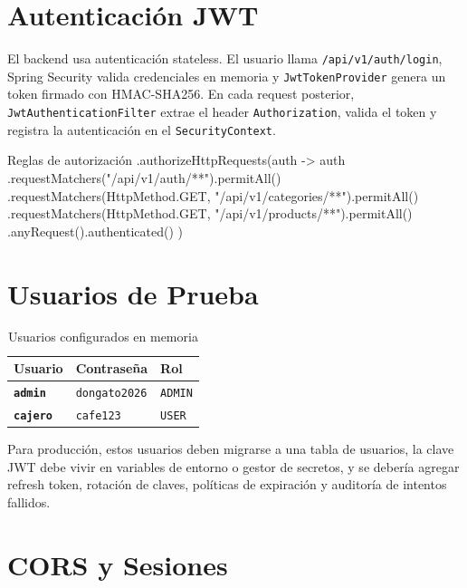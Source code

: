 \documentclass[11pt,oneside]{report}
\begin{document}
\section{Autenticación JWT}

El backend usa autenticación stateless. El usuario llama \texttt{/api/v1/auth/login}, Spring Security valida credenciales en memoria y \texttt{JwtTokenProvider} genera un token firmado con HMAC-SHA256. En cada request posterior, \texttt{JwtAuthenticationFilter} extrae el header \texttt{Authorization}, valida el token y registra la autenticación en el \texttt{SecurityContext}.

\begin{codewindow}[language=Java]{Reglas de autorización}
.authorizeHttpRequests(auth -> auth
        .requestMatchers("/api/v1/auth/**").permitAll()
        .requestMatchers(HttpMethod.GET, "/api/v1/categories/**").permitAll()
        .requestMatchers(HttpMethod.GET, "/api/v1/products/**").permitAll()
        .anyRequest().authenticated()
)
\end{codewindow}

\section{Usuarios de Prueba}

\begin{table}[h!]
\centering
\caption{Usuarios configurados en memoria}
\begin{tabularx}{\textwidth}{>{\bfseries}p{3cm} p{4cm} X}
\toprule
Usuario & Contraseña & Rol \\
\midrule
\texttt{admin} & \texttt{dongato2026} & \texttt{ADMIN}\\
\texttt{cajero} & \texttt{cafe123} & \texttt{USER}\\
\bottomrule
\end{tabularx}
\end{table}

\begin{warningbox}
Para producción, estos usuarios deben migrarse a una tabla de usuarios, la clave JWT debe vivir en variables de entorno o gestor de secretos, y se debería agregar refresh token, rotación de claves, políticas de expiración y auditoría de intentos fallidos.
\end{warningbox}

\section{CORS y Sesiones}
\end{document}
